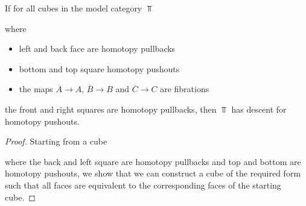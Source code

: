 \begin{prop}\label{prop:reductionStepDescent}
    If for all cubes in the model category $\Top$
    \begin{center}
    \end{center}
    where 
    \begin{itemize}
        \item left and back face are homotopy pullbacks
        \item bottom and top square homotopy pushouts %
        \item the maps $\overline{A}\to A$, $\overline{B}\to B$ and $\overline{C}\to C$ are fibrations
    \end{itemize}
    the front and right squares are homotopy pullbacks, then $\Top$ has descent for homotopy pushouts.
    \begin{proof}
        Starting from a cube 
        \begin{center}
        \end{center}
        where the back and left square are homotopy pullbacks and top and bottom are homotopy pushouts, we show that we can construct a cube of the required form such that all faces are equivalent to the corresponding faces of the starting cube.
        

\end{proof}
\end{prop}
